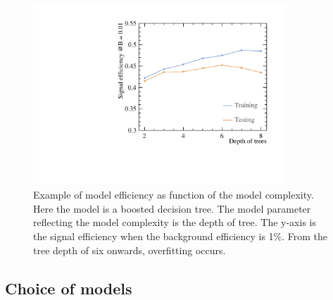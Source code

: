 

\begin{figure}[!tbp]
\includegraphics[width=0.85\textwidth]{doubleHiggs/DepthOfTrees.pdf}
\caption{Example of model efficiency as function of the model complexity. Here the model is a boosted decision tree. The model parameter reflecting the model complexity is the depth of tree. The y-axis is the signal efficiency when the background efficiency is 1\%. From the tree depth of six onwards, overfitting occurs.}
\label{fig:doubleHiggsMVAovertraining}
\end{figure}


\subsection{Choice of models}

